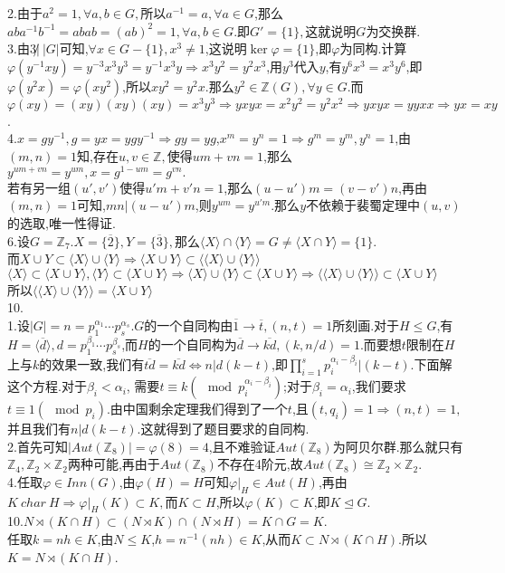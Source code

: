 \documentclass[b5paper]{ctexart}
\begin{document}
\pagestyle{plain}
\noindent
{}
2.由于$a^2=1,\forall a,b\in G,$所以$a^{-1}=a,\forall a\in G$,那么$aba^{-1}b^{-1}=abab=(ab)^2=1,\forall a,b\in G.$即$G'=\{1\},$这就说明$G$为交换群.\\
3.由$3\not |~|G|$可知,$\forall x\in G-\{1\},x^3\neq 1$,这说明$\ker\varphi=\{1\}$,即$\varphi$为同构.计算$\varphi(y^{-1}xy)=y^{-3}x^3y^3=y^{-1}x^3y\Rightarrow x^3y^2=y^2x^3$,用$y^3$代入$y$,有$y^6x^3=x^3y^6$,即$\varphi(y^2x)=\varphi(xy^2)$,所以$xy^2=y^2x$.那么$y^2\in\mathbb{Z}(G),\forall y\in G$.而$\varphi(xy)=(xy)(xy)(xy)=x^3y^3\Rightarrow yxyx=x^2y^2=y^2x^2\Rightarrow yxyx=yyxx\Rightarrow yx=xy$.\\
4.$x=gy^{-1},g=yx=ygy^{-1}\Rightarrow gy=yg$,$x^m=y^n=1\Rightarrow g^m=y^m,y^n=1$,由$(m,n)=1$知,存在$u,v\in\mathbb{Z},$使得$um+vn=1$,那么$y^{um+vn}=y^{um},x=g^{1-um}=g^{vn}.$\\
若有另一组$(u',v')$使得$u'm+v'n=1$,那么$(u-u')m=(v-v')n$,再由$(m,n)=1$可知,$mn|(u-u')m$,则$y^{um}=y^{u'm}$.那么$y$不依赖于裴蜀定理中$(u,v)$的选取,唯一性得证.\\
6.设$G=\mathbb{Z}_7.X=\{\overline{2}\},Y=\{\overline{3}\},$那么$\langle X\rangle\cap \langle Y\rangle=G\neq\langle X\cap Y\rangle=\{1\}$.\\
而$X\cup Y\subset \langle X\rangle\cup \langle Y\rangle\Rightarrow \langle X\cup Y\rangle\subset \langle\langle X\rangle\cup \langle Y\rangle\rangle$\\
$\langle X\rangle \subset \langle X\cup Y\rangle ,\langle Y\rangle\subset \langle X\cup Y\rangle\Rightarrow \langle X\rangle\cup \langle Y\rangle \subset \langle X\cup Y\rangle\Rightarrow \langle\langle X\rangle\cup \langle Y\rangle\rangle \subset \langle X\cup Y\rangle$\\
所以$\langle\langle X\rangle\cup \langle Y\rangle\rangle= \langle X\cup Y\rangle$\\
10.\\
1.设$|G|=n=p_1^{\alpha_1}\cdots p_s^{\alpha_s}$.$G$的一个自同构由$\overline{1}\to \overline{t},(n,t)=1$所刻画.对于$H\leq G$,有$H=\langle \overline{d}\rangle,d=p_1^{\beta_1}\cdots p_s^{\beta_s}$,而$H$的一个自同构为$\overline{d}\to \overline{kd},(k,n/d)=1$.而要想$t$限制在$H$上与$k$的效果一致,我们有$\overline{td}=\overline{kd}\Leftrightarrow  n|d(k-t)$,即$\prod_{i=1}^sp_i^{\alpha_i-\beta_i}|(k-t)$.下面解这个方程.对于$\beta_i <\alpha_i $,
需要$t\equiv k(\mod{p_i^{\alpha_i-\beta_i}})$;对于$\beta_i=\alpha_i$,我们要求$t\equiv 1(\mod{p_i})$.由中国剩余定理我们得到了一个$t$,且$(t,q_i)=1\Rightarrow (n,t)=1,$并且我们有$n|d(k-t)$.这就得到了题目要求的自同构.\\
2.首先可知$|Aut(\mathbb{Z}_8)|=\varphi(8)=4$,且不难验证$Aut(\mathbb{Z}_8)$为阿贝尔群.那么就只有$\mathbb{Z}_4,\mathbb{Z}_2\times\mathbb{Z}_2$两种可能,再由于$Aut(\mathbb{Z}_8)$不存在4阶元,故$Aut(\mathbb{Z}_8)\cong \mathbb{Z}_2\times\mathbb{Z}_2$.\\
4.任取$\varphi\in Inn(G)$,由$\varphi(H)=H$可知$\varphi|_{H}\in Aut(H)$,再由$K~char~H\Rightarrow \varphi|_{H}(K)\subset K,$而$K\subset H$,所以$\varphi(K)\subset K$,即$K \unlhd G.$\\
10.$N\rtimes (K\cap H)\subset (N\rtimes K)\cap (N\rtimes H)=K\cap G=K.$\\
任取$k=nh\in K$,由$N\leq K$,$h=n^{-1}(nh)\in K$,从而$K\subset N\rtimes (K\cap H)$.所以$K=N\rtimes (K\cap H)$.
\end{document}
